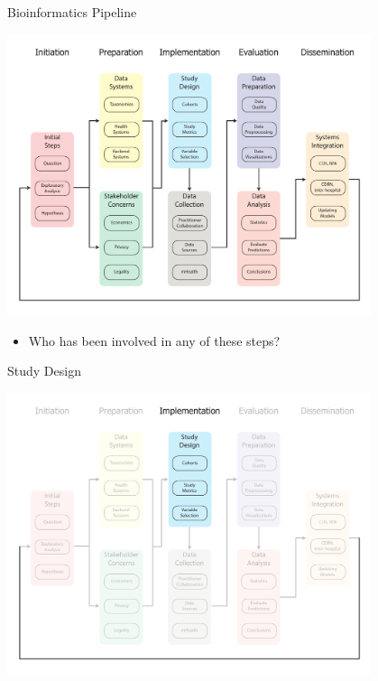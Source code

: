 \documentclass[10pt]{beamer}
\begin{document}
\begin{frame}{Bioinformatics Pipeline}
	\begin{center}
		\includegraphics[width=0.8\textwidth]{images/informatics_pipeline.pdf}	
	\end{center}
	\begin{itemize}
		\item Who has been involved in any of these steps?
	\end{itemize}
\end{frame}


\begin{frame}{Study Design}
	\begin{center}
		\includegraphics[width=0.8\textwidth]{images/informatics_pipeline_studydesign.pdf}
	\end{center}
\end{frame}
\end{document}
